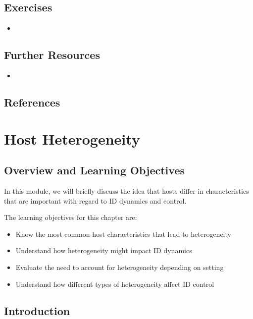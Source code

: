 \documentclass[]{book}
\providecommand{\tightlist}{%
  \setlength{\itemsep}{0pt}\setlength{\parskip}{0pt}}
\theoremstyle{definition}
\theoremstyle{definition}
\theoremstyle{definition}
\theoremstyle{remark}
\begin{document}
\section{Exercises}\label{exercises-9}

\begin{itemize}
\item
\end{itemize}

\section{Further Resources}\label{further-resources-9}

\begin{itemize}
\item
\end{itemize}

\section{References}\label{references-10}

\chapter{Host Heterogeneity}\label{host-heterogeneity}

\section{Overview and Learning
Objectives}\label{overview-and-learning-objectives-10}

In this module, we will briefly discuss the idea that hosts differ in
characteristics that are important with regard to ID dynamics and
control.

The learning objectives for this chapter are:

\begin{itemize}
\tightlist
\item
  Know the most common host characteristics that lead to heterogeneity
\item
  Understand how heterogeneity might impact ID dynamics
\item
  Evaluate the need to account for heterogeneity depending on setting
\item
  Understand how different types of heterogeneity affect ID control
\end{itemize}

\section{Introduction}\label{introduction-10}
\end{document}
